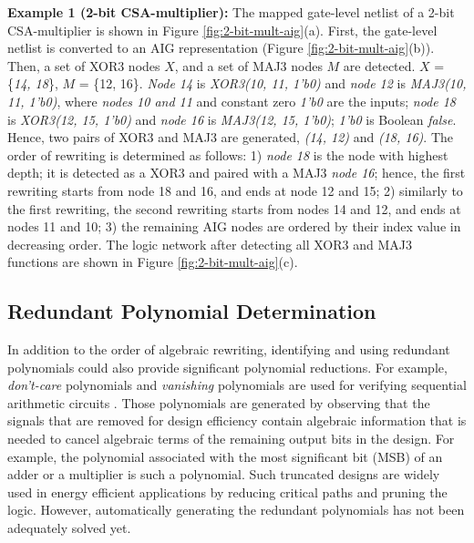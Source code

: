 \textbf{Example 1 (2-bit CSA-multiplier):} The mapped gate-level netlist of a 2-bit CSA-multiplier is shown in Figure \ref{fig:2-bit-mult-aig}(a). First, the gate-level netlist is converted to an AIG representation (Figure \ref{fig:2-bit-mult-aig}(b)). Then, a set of XOR3 nodes $X$, and a set of MAJ3 nodes $M$ are detected. $X$ = \{\textit{14, 18}\}, $M$ = \{12, 16\}. \textit{Node 14} is \textit{XOR3(10, 11, 1'b0)} and \textit{node 12} is \textit{MAJ3(10, 11, 1'b0)}, where \textit{nodes 10 and 11} and constant zero \textit{1'b0} are the inputs; \textit{node 18} is \textit{XOR3(12, 15, 1'b0)} and \textit{node 16} is \textit{MAJ3(12, 15, 1'b0)}; \textit{1'b0} is Boolean \textit{false}. Hence, two pairs of XOR3 and MAJ3 are generated, \textit{(14, 12)} and \textit{(18, 16)}. The order of rewriting is determined as follows: 1) \textit{node 18} is the node with highest depth; it is detected as a XOR3 and paired with a MAJ3 \textit{node 16}; hence, the first rewriting starts from node 18 and 16, and ends at node 12 and 15; 2) similarly to the first rewriting, the second rewriting starts from nodes 14 and 12, and ends at nodes 11 and 10; 3) the remaining AIG nodes are ordered by their index value in decreasing order. The logic network after detecting all XOR3 and MAJ3 functions are shown in Figure \ref{fig:2-bit-mult-aig}(c). %


\subsection{Redundant Polynomial Determination}

In addition to the order of algebraic rewriting, identifying and using redundant polynomials could also provide significant polynomial reductions. For example, \textit{don't-care} polynomials and \textit{vanishing} polynomials are used for verifying sequential arithmetic circuits \cite{yu-isvlsi-16a}. Those polynomials are generated by observing that the signals that are removed for design efficiency contain algebraic information that is needed to cancel algebraic terms of the remaining output bits in the design. For example, the polynomial associated with the most significant bit (MSB) of an adder or a multiplier is such a polynomial. Such truncated designs are widely used in energy efficient applications by reducing critical paths and pruning the logic. However, automatically generating the redundant polynomials has not been adequately solved yet. 
%

